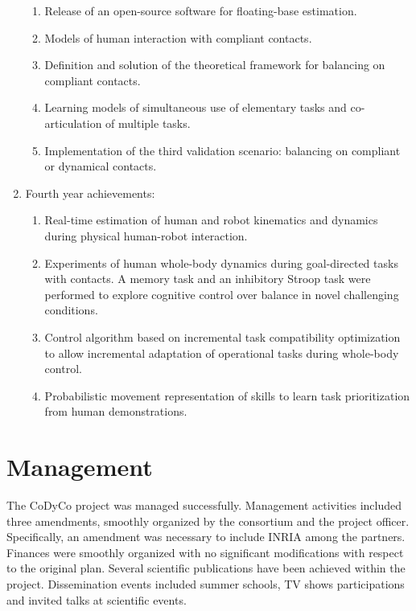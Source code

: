 \documentclass[12pt,a4paper,twoside]{article}
\begin{document}
\begin{enumerate}
\begin{enumerate}
\item Release of an open-source software for floating-base estimation.

\item Models of human interaction with compliant contacts.

\item Definition and solution of the theoretical framework for balancing on compliant contacts.

\item Learning models of simultaneous use of elementary tasks and co-articulation of multiple tasks.

\item Implementation of the third validation scenario: balancing on compliant or dynamical contacts.

\end{enumerate}

\item Fourth year achievements:
\begin{enumerate}
\item Real-time estimation of human and robot kinematics and dynamics during physical human-robot interaction. 

\item Experiments of human whole-body dynamics during goal-directed tasks with contacts. A memory task and an inhibitory Stroop task were performed to explore cognitive control over balance in novel challenging conditions.

\item Control algorithm based on incremental task compatibility optimization to allow incremental adaptation of operational tasks during whole-body control. 

\item Probabilistic movement representation of skills to learn task prioritization from human demonstrations. 
\end{enumerate}
\end{enumerate}

\section{Management}

The CoDyCo project was managed successfully. Management activities included three amendments, smoothly organized by the consortium and the project officer. Specifically, an amendment was necessary to include INRIA among the partners. Finances were smoothly organized with no significant modifications with respect to the original plan. Several scientific publications have been achieved within the project. Dissemination events included summer schools, TV shows participations and invited talks at scientific events.
\end{document}
